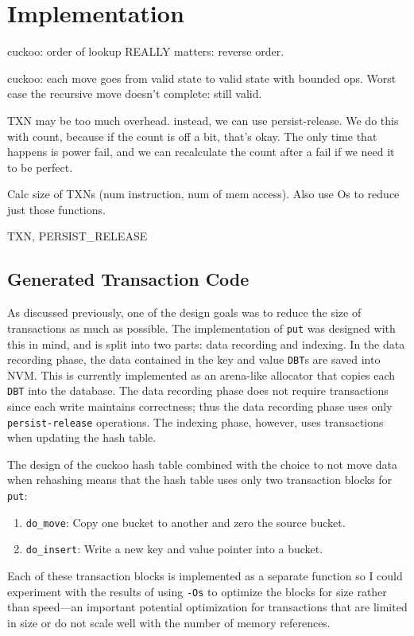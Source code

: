 \section{Implementation}

cuckoo:
order of lookup REALLY matters: reverse order.




cuckoo: each move goes from valid state to valid state with bounded
ops. Worst case the recursive move doesn't complete: still valid.

TXN may be too much overhead. instead, we can use persist-release. We do this
with count, because if the count is off a bit, that's okay. The only time that
happens is power fail, and we can recalculate the count after a fail if we need
it to be perfect.



Calc size of TXNs (num instruction, num of mem access). Also use Os to reduce just
those functions.


TXN, PERSIST\_RELEASE

\subsection{Generated Transaction Code}

As discussed previously, one of the design goals was to reduce the size of
transactions as much as possible. The implementation of \texttt{put} was
designed with this in mind, and is split into two parts: data recording and
indexing. In the data recording phase, the data contained in the key and value
\texttt{DBT}s are saved into NVM. This is currently implemented as an arena-like
allocator that copies each \texttt{DBT} into the database. The data recording
phase does not require transactions since each write maintains correctness; thus
the data recording phase uses only \texttt{persist-release} operations. The
indexing phase, however, uses transactions when updating the hash table.

The design of the cuckoo hash table combined with the choice to not move data
when rehashing means that the hash table uses only two transaction blocks for
\texttt{put}:
\begin{enumerate}
\item \texttt{do\_move}: Copy one bucket to another and zero the source bucket.
\item \texttt{do\_insert}: Write a new key and value pointer into a bucket.
\end{enumerate}
Each of these transaction blocks is implemented as a separate function so I
could experiment with the results of using \texttt{-Os} to optimize the blocks
for size rather than speed---an important potential optimization for
transactions that are limited in size or do not scale well with the number of
memory references.

